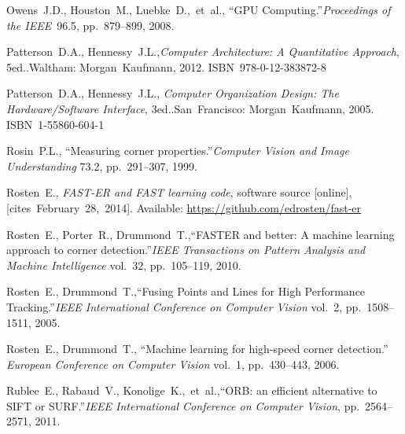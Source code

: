 {\begin{thebibliography}{99}
			Owens~J.D., Houston~M., Luebke~D.,~et~al.,
			``GPU Computing.''\linebreak[1]
			\textit{Proceedings of the IEEE}~96.5, pp.~879--899,
			2008.
		
			Patterson~D.A., Hennessy~J.L.,\linebreak[1]
			\textit{Computer Architecture: A Quantitative Approach},
				5\nth ed..\linebreak[1]
			Waltham: Morgan~Kaufmann, 2012. ISBN~978-0-12-383872-8
		
			Patterson~D.A., Hennessy~J.L., \linebreak[1]
			\textit{Computer Organization Design: %
				The Hardware/Software Interface}, 3\rd ed..\linebreak[1]
			San~Francisco: Morgan~Kaufmann, 2005. ISBN~1-55860-604-1
		
			Rosin~P.L.,
			``Measuring corner properties.''\linebreak[1]
			\textit{Computer Vision and Image Understanding} 73.2,
			pp.~291--307, 1999.
		
			Rosten~E.,
			\textit{FAST-ER and FAST learning code},
			software source [online], [cites~February~28,~2014].
			Available: \url{https://github.com/edrosten/fast-er}
		
			Rosten~E., Porter~R., Drummond~T.,\linebreak[1]
			``FASTER and better: A machine learning approach to corner detection.''\linebreak[1]
			\textit{IEEE Transactions on Pattern Analysis and Machine Intelligence} vol.~32,
			pp.~105--119, 2010.
		
			Rosten~E., Drummond~T.,\linebreak[1]
			``Fusing Points and Lines for High Performance Tracking.''\linebreak[1]
			\textit{IEEE International Conference on Computer Vision} vol.~2,
			pp.~1508--1511, 2005.
		
			Rosten~E., Drummond~T.,
			``Machine learning for high-speed corner detection.''
			\textit{European Conference on Computer Vision} vol.~1, pp.~430--443,
			2006.
		
			Rublee~E., Rabaud~V., Konolige~K.,~et~al.,\linebreak[1]
			``ORB: an efficient alternative to SIFT or SURF.''\linebreak[1]
			\textit{IEEE International Conference on Computer Vision},
			pp.~2564--2571, 2011.
		

\end{thebibliography}}
